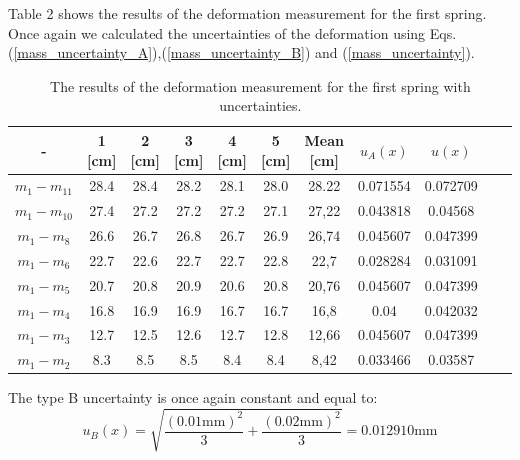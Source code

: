 \documentclass[a4paper,12pt,titlepage,bibliography=numbered]{article}
\begin{document}
\noindent Table 2 shows the results of the deformation measurement for the first spring. Once again we calculated the uncertainties of the deformation using Eqs. (\ref{mass_uncertainty_A}),(\ref{mass_uncertainty_B}) and (\ref{mass_uncertainty}).
\begin{table}[H]
\centering
\caption{The results of the deformation measurement for the first spring with uncertainties.} \label{table_wth_deformation_1}
\begin{tabular}{|c|c|c|c|c|c|c|c|c|c|c|}
\hline
\textbf{-} & \textbf{1 [cm]} & \textbf{2 [cm]} & \textbf{3 [cm]} & \textbf{4 [cm]} & \textbf{5 [cm]}& \textbf{Mean [cm]} & \textbf{$u_A(x)$} & \textbf{$u(x)$} \\ 
\hline
$m_1 - m_{11}$ & 28.4 & 28.4 & 28.2 & 28.1 & 28.0 & 28.22 & 0.071554 & 0.072709 \\ 
\hline
$m_1 - m_{10}$ & 27.4 & 27.2 & 27.2 & 27.2 & 27.1 & 27,22 & 0.043818 & 0.04568 \\ 
\hline
$m_1 - m_8$ & 26.6 & 26.7 & 26.8 & 26.7 & 26.9 & 26,74 & 0.045607 & 0.047399 \\ 
\hline
$m_1 - m_6$ & 22.7 & 22.6 & 22.7 & 22.7 & 22.8 & 22,7 & 0.028284 & 0.031091 \\ 
\hline
$m_1 - m_5$ & 20.7 & 20.8 & 20.9 & 20.6 & 20.8 & 20,76 & 0.045607 & 0.047399 \\ 
\hline
$m_1 - m_4$ & 16.8 & 16.9 & 16.9 & 16.7 & 16.7 & 16,8 & 0.04 & 0.042032 \\ 
\hline
$m_1 - m_3$ & 12.7 & 12.5 & 12.6 & 12.7 & 12.8 & 12,66 & 0.045607 & 0.047399 \\ 
\hline
$m_1 - m_2$ & 8.3 & 8.5 & 8.5 & 8.4 & 8.4 & 8,42 & 0.033466 & 0.03587 \\ 
\hline
\end{tabular}
\end{table}

\noindent The type B uncertainty is once again constant and equal to: \\
\begin{equation}
    u_B(x) = \sqrt{\frac{(0.01 \mathrm{mm})^2}{3} + \frac{(0.02 \mathrm{mm})^2}{3}} = 0.012910 \mathrm{mm}
\end{equation}
\end{document}
